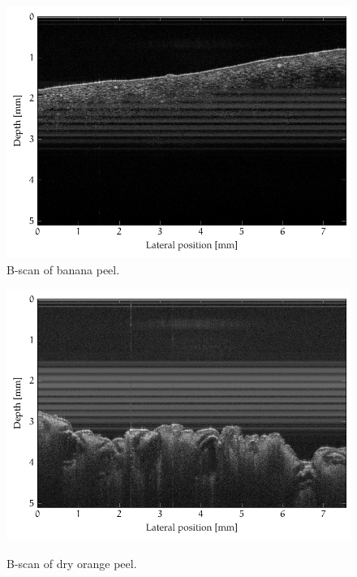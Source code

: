 \begin{figure}[hbt]
	\centering
	\includegraphics[width=\linewidth]{gfx/tikz/axsun/banana-peel}
	\caption{B-scan of banana peel.}\label{fig:banana-peel}
\end{figure}%
\begin{figure}[hbt]
	\myfloatalign
	{\includegraphics[width=\linewidth]{gfx/tikz/axsun/dry-orange-peel}}
	\caption{B-scan of dry orange peel.}\label{fig:dry-orange-peel}
\end{figure}%

